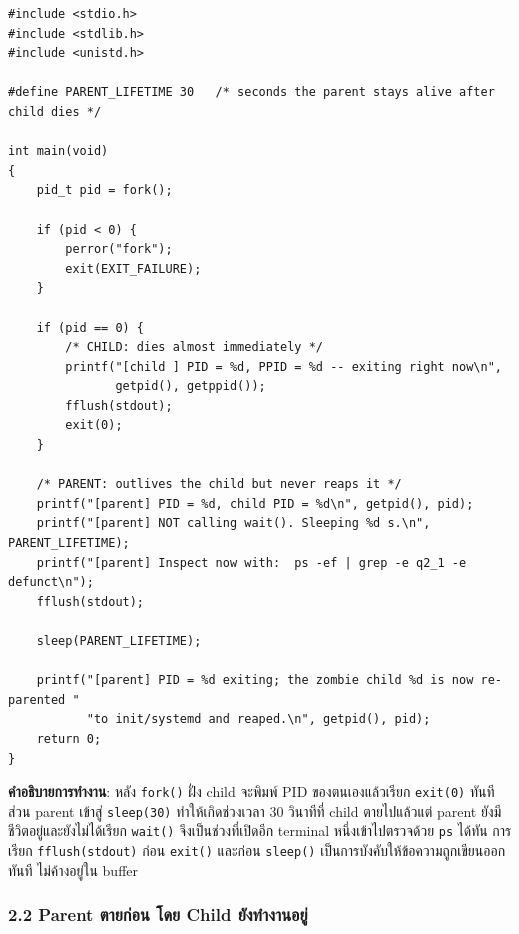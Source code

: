 \documentclass[a4paper,12pt]{article}
\newcommand{\code}[1]{\texttt{#1}}
\begin{document}
\begin{lstlisting}[caption={q2\_1\_child\_first.c -- child dies first, parent never reaps},label={lst:q2_1}]
#include <stdio.h>
#include <stdlib.h>
#include <unistd.h>

#define PARENT_LIFETIME 30   /* seconds the parent stays alive after child dies */

int main(void)
{
    pid_t pid = fork();

    if (pid < 0) {
        perror("fork");
        exit(EXIT_FAILURE);
    }

    if (pid == 0) {
        /* CHILD: dies almost immediately */
        printf("[child ] PID = %d, PPID = %d -- exiting right now\n",
               getpid(), getppid());
        fflush(stdout);
        exit(0);
    }

    /* PARENT: outlives the child but never reaps it */
    printf("[parent] PID = %d, child PID = %d\n", getpid(), pid);
    printf("[parent] NOT calling wait(). Sleeping %d s.\n", PARENT_LIFETIME);
    printf("[parent] Inspect now with:  ps -ef | grep -e q2_1 -e defunct\n");
    fflush(stdout);

    sleep(PARENT_LIFETIME);

    printf("[parent] PID = %d exiting; the zombie child %d is now re-parented "
           "to init/systemd and reaped.\n", getpid(), pid);
    return 0;
}
\end{lstlisting}

\textbf{คำอธิบายการทำงาน}: หลัง \code{fork()} ฝั่ง child จะพิมพ์ PID ของตนเองแล้วเรียก \code{exit(0)} ทันที ส่วน parent เข้าสู่ \code{sleep(30)} ทำให้เกิดช่วงเวลา 30 วินาทีที่ child ตายไปแล้วแต่ parent ยังมีชีวิตอยู่และยังไม่ได้เรียก \code{wait()} จึงเป็นช่วงที่เปิดอีก terminal หนึ่งเข้าไปตรวจด้วย \code{ps} ได้ทัน การเรียก \code{fflush(stdout)} ก่อน \code{exit()} และก่อน \code{sleep()} เป็นการบังคับให้ข้อความถูกเขียนออกทันที ไม่ค้างอยู่ใน buffer

\newpage

\subsubsection{2.2 Parent ตายก่อน โดย Child ยังทำงานอยู่}
\end{document}
